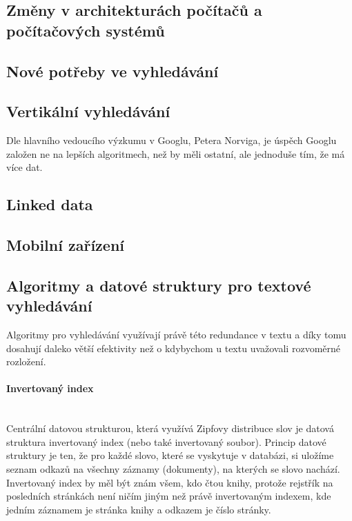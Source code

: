 \documentclass[11pt]{article}
\begin{document}
\subsection{Změny v architekturách počítačů a počítačových systémů}


\subsection{Nové potřeby ve vyhledávání}
\subsection{Vertikální vyhledávání}
Dle hlavního vedoucího výzkumu v Googlu, Petera Norviga, je úspěch Googlu
založen ne na lepších algoritmech, než by měli ostatní, ale jednoduše tím, že
má více dat.
\subsection{Linked data}
\subsection{Mobilní zařízení}


\subsection{Algoritmy a datové struktury pro textové vyhledávání}
Algoritmy pro vyhledávání využívají právě této redundance v textu a díky tomu
dosahují daleko větší efektivity než o kdybychom u textu uvažovali rozvoměrné
rozložení.

\paragraph{Invertovaný index} \mbox{}\\
Centrální datovou strukturou, která využívá Zipfovy distribuce slov je datová
struktura invertovaný index (nebo také invertovaný soubor). Princip datové
struktury je ten, že pro každé slovo, které se vyskytuje v databázi, si uložíme
seznam odkazů na všechny záznamy (dokumenty), na kterých se slovo nachází.
Invertovaný index by měl být znám všem, kdo čtou knihy, protože rejstřík na
posledních stránkách není ničím jiným než právě invertovaným indexem, kde
jedním záznamem je stránka knihy a odkazem je číslo stránky. 
\end{document}
